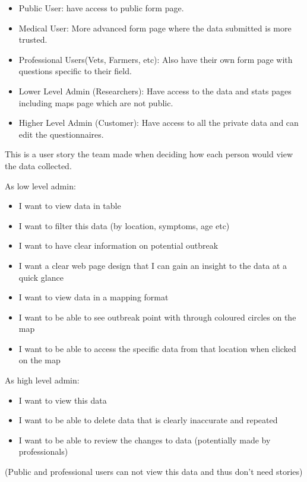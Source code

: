 \documentclass{l3proj}
\begin{document}
\begin{itemize}
    \item Public User: have access to public form page.
    \item Medical User: More advanced form page where the data submitted is more trusted.
    \item Professional Users(Vets, Farmers, etc): Also have their own form page with questions specific to their field.
    \item Lower Level Admin (Researchers): Have access to the data and stats pages including maps page which are not public.
    \item Higher Level Admin (Customer): Have access to all the private data and can edit the questionnaires.
\end{itemize}


This is a user story the team made when deciding how each person would view the data collected.

As low level admin:
\begin{itemize}
    \item I want to view data in table
    \item I want to filter this data (by location, symptoms, age etc)
    \item I want to have clear information on potential outbreak
    \item I want a clear web page design that I can gain an insight to the data at a quick glance
    \item I want to view data in a mapping format
    \item I want to be able to see outbreak point with through coloured circles on the map
    \item I want to be able to access the specific data from that location when clicked on the map
\end{itemize}

As high level admin:
\begin{itemize}
    \item I want to view this data
    \item I want to be able to delete data that is clearly inaccurate and repeated
    \item I want to be able to review the changes to data (potentially made by professionals)
\end{itemize}

(Public and professional users can not view this data and thus don't need stories)

\newpage
\end{document}
